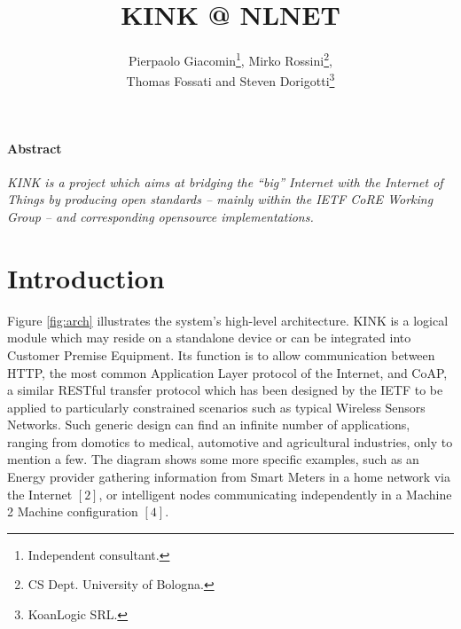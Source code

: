 \documentclass[12pt]{article}
\title{KINK @ NLNET}
\author{Pierpaolo Giacomin\footnote{Independent consultant.}, Mirko Rossini\footnote{CS Dept. University of Bologna.},\\Thomas Fossati and Steven Dorigotti\footnote{KoanLogic SRL.}}
\begin{document}
\maketitle
\tableofcontents
\newpage

\paragraph{Abstract}
\emph{KINK is a project which aims at bridging the ``big'' Internet with the Internet of Things by producing open standards -- mainly within the IETF CoRE Working Group -- and corresponding \mbox{opensource} implementations.}\\

\section{Introduction}
\label{sec:intro}

Figure \ref{fig:arch} illustrates the system's high-level architecture. KINK is a logical module which may reside on a standalone device or can be integrated into Customer Premise Equipment. Its function is to allow communication between HTTP, the most common Application Layer protocol of the Internet, and CoAP, a similar RESTful transfer protocol which has been designed by the IETF to be applied to particularly constrained scenarios such as typical Wireless Sensors Networks. Such generic design can find an infinite number of applications, ranging from domotics to medical, automotive and agricultural industries, only to mention a few. The diagram shows some more specific examples, such as an Energy provider gathering information from Smart Meters in a home network via the Internet $[2]$, or intelligent nodes communicating independently in a Machine 2 Machine configuration $[4]$.
\end{document}
